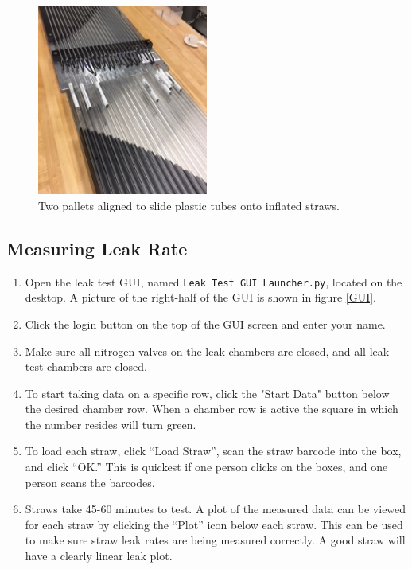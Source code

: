 \documentclass[letterpaper,12pt]{article}
\begin{document}
\begin{figure}
	\centering
	\includegraphics[width=0.5\textwidth,angle=-90]{adjacent_pallets}
	\caption{Two pallets aligned to slide plastic tubes onto inflated straws.}
	\label{tubes on pallet}
\end{figure}


\subsection{Measuring Leak Rate}
	\begin{enumerate}
    	\item Open the leak test GUI, named {\tt Leak Test GUI Launcher.py}, located on the desktop.  A picture of the right-half of the GUI is shown in figure \ref{GUI}.
        \item Click the login button on the top of the GUI screen and enter your name.
        \item Make sure all nitrogen valves on the leak chambers are closed, and all leak test chambers are closed.
        \item To start taking data on a specific row, click the "Start Data" button below the desired chamber row.  When a chamber row is active the square in which the number resides will turn green.
        \item To load each straw, click ``Load Straw'', scan the straw barcode into the box, and click ``OK.'' This is quickest if one person clicks on the boxes, and one person scans the barcodes.
        \item Straws take 45-60 minutes to test.  A plot of the measured data can be viewed for each straw by clicking the ``Plot'' icon below each straw. This can be used to make sure straw leak rates are being measured correctly. A good straw will have a clearly linear leak plot.
        \end{enumerate}
\end{document}
